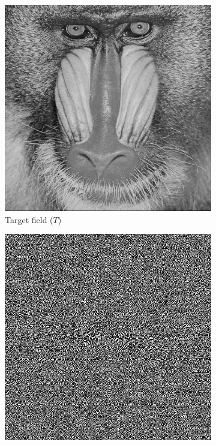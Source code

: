 \begin{figure}[H]
  \centering
  \begin{subfigure}[t]{0.3\textwidth}
    \centering
    \includegraphics[width=\textwidth]{mandrill.png}
    \caption{Target field ($T$)}
  \end{subfigure}
  \hfill
  \begin{subfigure}[t]{0.3\textwidth}
    \centering
    \includegraphics[width=\textwidth]{Naive_output_holo.png}

\end{subfigure}
\end{figure}
